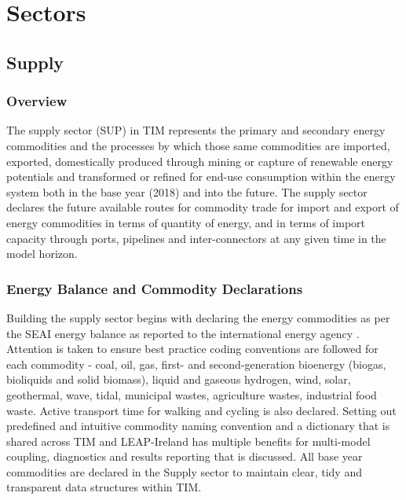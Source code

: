 \documentclass[gmd,manuscript]{copernicus}
\begin{document}

\section{Sectors}
\label{s:sectors}

\subsection{Supply}
\label{ss:supply}
\subsubsection{Overview}
The supply sector (SUP) in TIM represents the primary and secondary energy commodities and the processes by which those same commodities are imported, exported, domestically produced through mining or capture of renewable energy potentials and transformed or refined for end-use consumption within the energy system both in the base year (2018) and into the future. The supply sector declares the future available routes for commodity trade for import and export of energy commodities in terms of quantity of energy, and in terms of import capacity through ports, pipelines and inter-connectors at any given time in the model horizon. 

\subsubsection{Energy Balance and Commodity Declarations}
Building the supply sector begins with declaring the energy commodities as per the SEAI energy balance as reported to the international energy agency \citep{SEAI2019}. Attention is taken to ensure best practice coding conventions are followed for each commodity - coal, oil, gas, first- and second-generation bioenergy (biogas, bioliquids and solid biomass), liquid and gaseous hydrogen, wind, solar, geothermal, wave, tidal, municipal wastes, agriculture wastes, industrial food waste. Active transport time for walking and cycling is also declared. Setting out predefined and intuitive commodity naming convention and a dictionary that is shared across TIM and LEAP-Ireland has multiple benefits for multi-model coupling, diagnostics and results reporting that is discussed. All base year commodities are declared in the Supply sector to maintain clear, tidy and transparent data structures within TIM.
\end{document}
